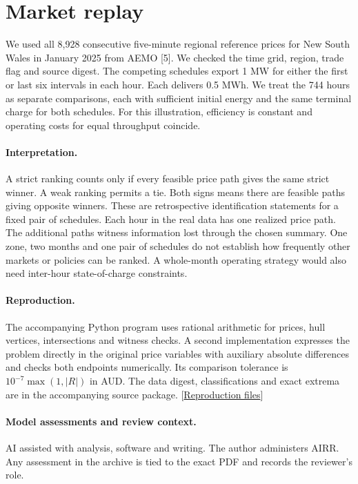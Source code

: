 \documentclass[11pt]{article}
\begin{document}
\section{Market replay}
We used all 8,928 consecutive five-minute regional reference prices for New South Wales in January 2025 from AEMO [5]. We checked the time grid, region, trade flag and source digest. The competing schedules export 1 MW for either the first or last six intervals in each hour. Each delivers 0.5 MWh. We treat the 744 hours as separate comparisons, each with sufficient initial energy and the same terminal charge for both schedules. For this illustration, efficiency is constant and operating costs for equal throughput coincide.

\newpage


\paragraph{Interpretation.}
A strict ranking counts only if every feasible price path gives the same strict winner. A weak ranking permits a tie. Both signs means there are feasible paths giving opposite winners. These are retrospective identification statements for a fixed pair of schedules. Each hour in the real data has one realized price path. The additional paths witness information lost through the chosen summary. One zone, two months and one pair of schedules do not establish how frequently other markets or policies can be ranked. A whole-month operating strategy would also need inter-hour state-of-charge constraints.

\paragraph{Reproduction.}
The accompanying Python program uses rational arithmetic for prices, hull vertices, intersections and witness checks. A second implementation expresses the problem directly in the original price variables with auxiliary absolute differences and checks both endpoints numerically. Its comparison tolerance is $10^{-7}\max(1,|R|)$ in AUD. The data digest, classifications and exact extrema are in the accompanying source package. [\href{https://github.com/lluiseriksson/THE-ERIKSSON-PROGRAMME/tree/codex/despacho-baterias-20261120/audits/battery-price-summaries}{Reproduction files}]

\paragraph{Model assessments and review context.}
AI assisted with analysis, software and writing. The author administers AIRR. Any assessment in the archive is tied to the exact PDF and records the reviewer's role.
\end{document}
